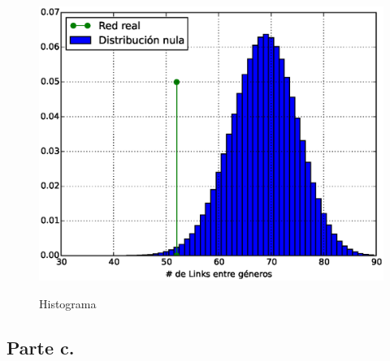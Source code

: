 \begin{figure}[h]
\centering
\includegraphics[scale = 0.50]{figuras/Histograma}
\label{fig:Histograma}
\caption{Histograma}
\end{figure}

\subsection{Parte c.}

